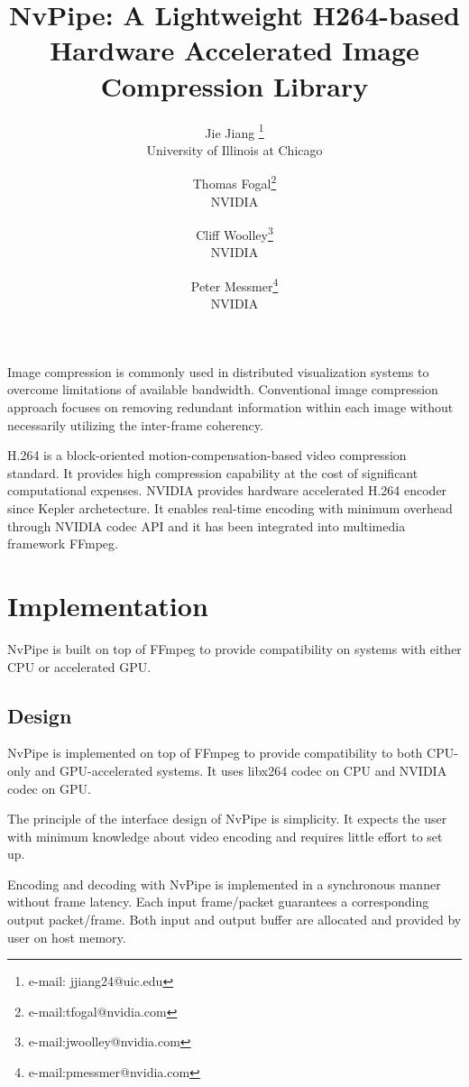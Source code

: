 \documentclass{vgtc}                          %
\title{NvPipe: A Lightweight H264-based Hardware Accelerated Image Compression Library}
\author{Jie Jiang \thanks{e-mail: jjiang24@uic.edu}\\ %
        \scriptsize University of Illinois at Chicago %
\and Thomas Fogal\thanks{e-mail:tfogal@nvidia.com}\\ %
     \scriptsize NVIDIA %
\and Cliff Woolley\thanks{e-mail:jwoolley@nvidia.com}\\ %
     \scriptsize NVIDIA %
\and Peter Messmer\thanks{e-mail:pmessmer@nvidia.com}\\ %
     \scriptsize NVIDIA} %
\begin{document}


\maketitle

Image compression is commonly used in distributed visualization systems to overcome limitations of available bandwidth. Conventional image compression approach focuses on removing redundant information within each image without necessarily utilizing the inter-frame coherency.

H.264 is a block-oriented motion-compensation-based video compression standard. It provides high compression capability at the cost of significant computational expenses. NVIDIA provides hardware accelerated H.264 encoder since Kepler archetecture. It enables real-time encoding with minimum overhead through NVIDIA codec API and it has been integrated into multimedia framework FFmpeg. 

\section{Implementation}

NvPipe is built on top of FFmpeg to provide compatibility on systems with either CPU or accelerated GPU.

\subsection{Design}

NvPipe is implemented on top of FFmpeg to provide compatibility to both CPU-only and GPU-accelerated systems. It uses libx264 codec on CPU and NVIDIA codec on GPU. 

The principle of the interface design of NvPipe is simplicity. It expects the user with minimum knowledge about video encoding and requires little effort to set up.

Encoding and decoding with NvPipe is implemented in a synchronous manner without frame latency. Each input frame/packet guarantees a corresponding output packet/frame. Both input and output buffer are allocated and provided by user on host memory.
\end{document}
